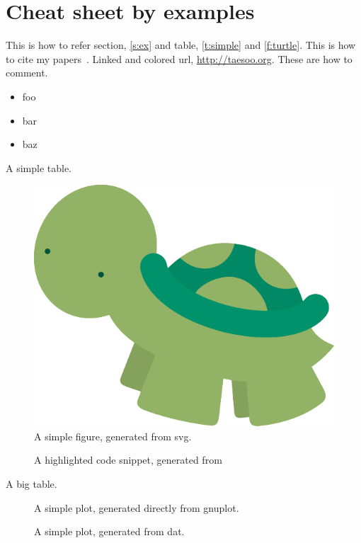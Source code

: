 \section{Cheat sheet by examples}
\label{s:ex}

This is how to refer section, \autoref{s:ex} and table,
\autoref{t:simple} and \autoref{f:turtle}.
This is how to cite my papers~\cite{kim:userfs,kim:poirot}.
Linked and colored url, \url{http://taesoo.org}. These are how to
comment.

\begin{itemize}[noitemsep,nolistsep]
 \setlength{\itemsep}{-0pt}
 \item foo
 \item bar
 \item baz
\end{itemize}

\begin{table}[h]
\centering
\footnotesize

\caption{A simple table.}
\label{t:simple}
\end{table}

\begin{figure}[h]
\centering
\footnotesize
\includegraphics[width=0.5\columnwidth]{fig/ex-turtle}
\caption{A simple figure, generated from svg.}
\label{f:turtle}
\end{figure}

\begin{figure}[t]
\centering
\footnotesize

\caption{A highlighted code snippet, generated from 
}
\label{f:code}
\end{figure}

\begin{table}[t]
\centering
\footnotesize

\caption{A big table.}
\label{t:big}
\end{table}

\begin{figure}[T]
\centering
\footnotesize
{}
\caption{A simple plot, generated directly from gnuplot.}
\label{f:gaussian}
\end{figure}

\begin{figure}[T]
\centering
\footnotesize
{}
\caption{A simple plot, generated from dat.}
\label{f:plot}
\end{figure}
